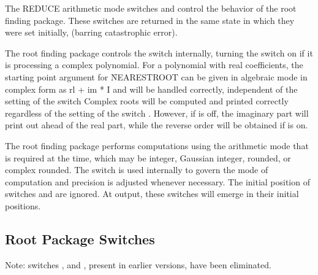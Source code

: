 The REDUCE arithmetic mode switches  and 
control the behavior of the root finding package.
These switches are returned in the same state in which they were set
initially, (barring catastrophic error).

\begin{description}
\item[COMPLEX] The root finding package controls the switch 
internally, turning the switch on if it is processing a complex
polynomial.
For a polynomial with real coefficients, the
starting point argument for \f{NEARESTROOT} can be given in algebraic mode in
complex form as rl + im * I and will be handled correctly, independent of
the setting of the switch  Complex roots will be computed
and printed correctly regardless of the setting of the switch .
However, if  is off, the imaginary part will print
out ahead of the real part, while the reverse order will be obtained if
 is on.

\item[ROUNDED] The
root finding package performs computations using the arithmetic mode that
is required at the time, which may be integer, Gaussian integer, rounded,
or complex rounded.  The switch  is used internally to govern
the mode of computation and precision is adjusted whenever necessary.  The
initial position of switches  and  are ignored.
At output, these switches will emerge in their initial positions.
\end{description}

\subsection{Root Package Switches}

Note: switches ,  and , present in
earlier versions, have been eliminated.


